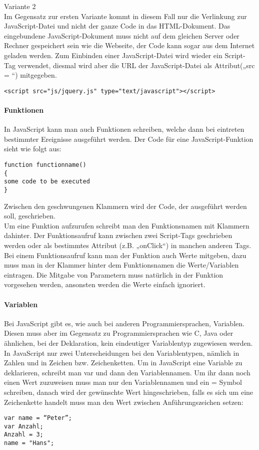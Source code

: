 Variante 2\\
Im Gegensatz zur ersten Variante kommt in diesem Fall nur die Verlinkung zur JavaScript-Datei und nicht der ganze Code in das HTML-Dokument. Das eingebundene JavaScript-Dokument muss nicht auf dem gleichen Server oder Rechner gespeichert sein wie die Webseite, der Code kann sogar aus dem Internet geladen werden. Zum Einbinden einer JavaScript-Datei wird wieder ein Script-Tag verwendet, diesmal wird aber die URL der JavaScript-Datei als Attribut(„src = “) mitgegeben.\\
\begin{lstlisting}
<script src="js/jquery.js" type="text/javascript"></script>
\end{lstlisting}

\paragraph*{Funktionen}
In JavaScript kann man auch Funktionen schreiben, welche dann bei eintreten bestimmter Ereignisse ausgeführt werden. Der Code für eine JavaScript-Funktion sieht wie folgt aus:\\
\begin{lstlisting}
function functionname()
{
some code to be executed
}
\end{lstlisting}
Zwischen den geschwungenen Klammern wird der Code, der ausgeführt werden soll, geschrieben.\\
Um eine Funktion aufzurufen schreibt man den Funktionsnamen mit Klammern dahinter. Der Funktionsaufruf kann zwischen zwei Script-Tags geschrieben werden oder als bestimmtes Attribut (z.B. „onClick“) in manchen anderen Tags.\\
Bei einem Funktionsaufruf kann man der Funktion auch Werte mitgeben, dazu muss man in der Klammer hinter dem Funktionsnamen die Werte/Variablen eintragen. Die Mitgabe von Parametern muss natürlich in der Funktion vorgesehen werden, ansonsten werden die Werte einfach ignoriert.\\

\paragraph*{Variablen}
Bei JavaScript gibt es, wie auch bei anderen Programmiersprachen, Variablen. Diesen muss aber im Gegensatz zu Programmiersprachen wie C, Java oder ähnlichen, bei der Deklaration, kein eindeutiger Variablentyp zugewiesen werden. In JavaScript nur zwei Unterscheidungen bei den Variablentypen, nämlich in Zahlen und in Zeichen bzw. Zeichenketten. 
Um in JavaScript eine Variable zu deklarieren, schreibt man var und dann den Variablennamen. Um ihr dann noch einen Wert zuzuweisen muss man nur den Variablennamen und ein = Symbol schreiben, danach wird der gewünschte Wert hingeschrieben, falls es sich um eine Zeichenkette handelt muss man den Wert zwischen Anführungszeichen setzen:\\
\begin{lstlisting} 
var name = “Peter”;
var Anzahl;
Anzahl = 3;
name = "Hans";
\end{lstlisting}

